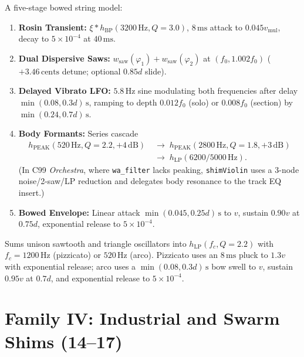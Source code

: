 \begin{definition}
A five-stage bowed string model:
\begin{enumerate}[leftmargin=1.5em]
  \item \textbf{Rosin Transient:} $\xi * h_{\mathrm{BP}}(3200\,\text{Hz}, Q=3.0)$, $8\,\text{ms}$ attack to $0.045 v_{\mathrm{mul}}$, decay to $5\times 10^{-4}$ at $40\,\text{ms}$.
  \item \textbf{Dual Dispersive Saws:} $w_{\mathrm{saw}}(\varphi_1) + w_{\mathrm{saw}}(\varphi_2)$ at $(f_0, 1.002 f_0)$ ($+3.46\,\text{cents}$ detune; optional $0.85d$ slide).
  \item \textbf{Delayed Vibrato LFO:} $5.8\,\text{Hz}$ sine modulating both frequencies after delay $\min(0.08, 0.3d)\,\text{s}$, ramping to depth $0.012 f_0$ (solo) or $0.008 f_0$ (section) by $\min(0.24, 0.7d)\,\text{s}$.
  \item \textbf{Body Formants:} Series cascade
  \begin{align*}
  h_{\mathrm{PEAK}}(520\,\text{Hz}, Q=2.2, +4\,\text{dB})
  &\;\to\; h_{\mathrm{PEAK}}(2800\,\text{Hz}, Q=1.8, +3\,\text{dB}) \\
  &\;\to\; h_{\mathrm{LP}}(6200 / 5000\,\text{Hz}).
  \end{align*}
  (In C99 \emph{Orchestra}, where \texttt{wa\_filter} lacks peaking, \texttt{shimViolin} uses a 3-node noise/2-saw/LP reduction and delegates body resonance to the track EQ insert.)
  \item \textbf{Bowed Envelope:} Linear attack $\min(0.045, 0.25d)\,\text{s}$ to $v$, sustain $0.90v$ at $0.75d$, exponential release to $5\times 10^{-4}$.
\end{enumerate}
\end{definition}

\begin{definition}
Sums unison sawtooth and triangle oscillators into $h_{\mathrm{LP}}(f_c, Q=2.2)$ with $f_c = 1200\,\text{Hz}$ (pizzicato) or $520\,\text{Hz}$ (arco). Pizzicato uses an $8\,\text{ms}$ pluck to $1.3v$ with exponential release; arco uses a $\min(0.08, 0.3d)\,\text{s}$ bow swell to $v$, sustain $0.95v$ at $0.7d$, and exponential release to $5\times 10^{-4}$.
\end{definition}

\section{Family IV: Industrial and Swarm Shims (14--17)}
\label{sec:fam-ind}

